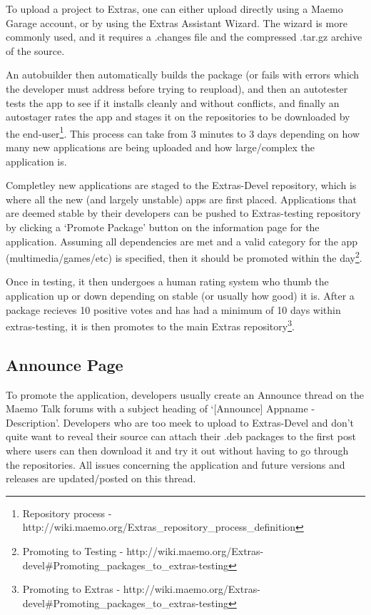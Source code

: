 To upload a project to Extras, one can either upload directly using a Maemo Garage account, or by using the Extras Assistant Wizard. The wizard is more commonly used, and it requires a .changes file and the compressed .tar.gz archive of the source.

An autobuilder then automatically builds the package (or fails with errors which the developer must address before trying to reupload), and then an autotester tests the app to see if it installs cleanly and without conflicts, and finally an autostager rates the app and stages it on the repositories to be downloaded by the end-user\footnote{Repository process - http://wiki.maemo.org/Extras\_repository\_process\_definition}\label{ref:repproc}. This process can take from 3 minutes to 3 days depending on how many new applications are being uploaded and how large/complex the application is.

Completley new applications are staged to the Extras-Devel repository, which is where all the new (and largely unstable) apps are first placed. Applications that are deemed stable by their developers can be pushed to Extras-testing repository by clicking a ‘Promote Package’ button on the information page for the application. Assuming all dependencies are met and a valid category for the app (multimedia/games/etc) is specified, then it should be promoted within the day\footnote{Promoting to Testing  - http://wiki.maemo.org/Extras-devel\#Promoting\_packages\_to\_extras-testing}\label{ref:promtest}. 

Once in testing, it then undergoes a human rating system who thumb the application up or down depending on stable (or usually how good) it is. After a package recieves 10 positive votes and has had a minimum of 10 days within extras-testing, it is then promotes to the main Extras repository\footnote{Promoting to Extras - http://wiki.maemo.org/Extras-devel\#Promoting\_packages\_to\_extras-testing}\label{ref:promext}.

\subsection{Announce Page}
To promote the application, developers usually create an Announce thread on the Maemo Talk forums with a subject heading of ‘[Announce] Appname - Description’. Developers who are too meek to upload to Extras-Devel and don’t quite want to reveal their source can attach their .deb packages to the first post where users can then download it and try it out without having to go through the repositories. All issues concerning the application and future versions and releases are updated/posted on this thread.

